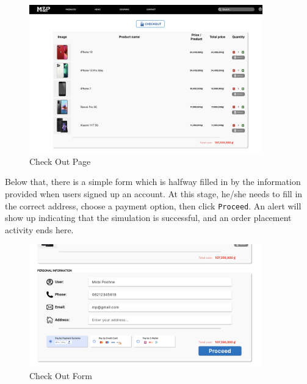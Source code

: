 \documentclass[a4paper]{article}
\numberwithin{equation}{section}
\begin{document}
\begin{figure}[H]
  \centering
  \includegraphics[width=0.9\textwidth]{assets/flow/cart.png}
  \caption{Check Out Page}
\end{figure}

Below that, there is a simple form which is halfway filled in by the information provided when users signed up an account.
At this stage, he/she needs to fill in the correct address, choose a payment option, then click {\tt Proceed}.
An alert will show up indicating that the simulation is successful, and an order placement activity ends here.

\begin{figure}[H]
  \centering
  \includegraphics[width=0.9\textwidth]{assets/flow/form.png}
  \caption{Check Out Form}
\end{figure}
\end{document}
